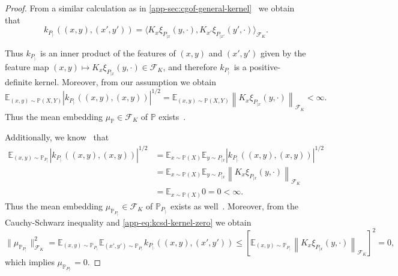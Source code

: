 \documentclass{uai2023} %
\begin{document}
\begin{proof}
From a similar calculation as in \cref{app-sec:cgof-general-kernel}~\cite[cf.][Section~A.2]{jitkrittum2020testing} we obtain that
\begin{equation*}
    k_{P_{|\cdot}}((x, y), (x', y')) = \bigg\langle K_x \xi_{P_{|x}}(y, \cdot), K_{x'} \xi_{P_{|x'}}(y', \cdot) \bigg\rangle_{\mathcal{F}_K}.
\end{equation*}

Thus $k_{P_{|\cdot}}$ is an inner product of the features of $(x, y)$ and $(x', y')$ given by the feature map $(x, y) \mapsto K_x \xi_{P_{|x}}(y, \cdot) \in \mathcal{F}_K$,
and therefore $k_{P_{|\cdot}}$ is a positive-definite kernel.
Moreover, from our assumption we obtain
\begin{equation*}
    \mathbb{E}_{(x, y) \sim \mathbb{P}(X, Y)} {|k_{P_{|\cdot}}((x, y), (x, y))|}^{1/2} = \mathbb{E}_{(x, y) \sim \mathbb{P}(X, Y)} \left\|K_{x} \xi_{P_{|x}}(y, \cdot) \right\|_{\mathcal{F}_K} < \infty.
\end{equation*}
Thus the mean embedding $\mu_{\mathbb{P}} \in \mathcal{F}_K$ of $\mathbb{P}$ exists~\citep[][Lemma~3]{gretton2012kernel}.

Additionally, we know~\citep[][Lemma~5.1]{Chwialkowski16KGOF} that
\begin{equation}\label{app-eq:kcsd-kernel-zero}
\begin{split}
\mathbb{E}_{(x, y) \sim \mathbb{P}_{P_{|\cdot}}} {|k_{P_{|\cdot}}((x, y), (x, y))|}^{1/2} &= \mathbb{E}_{x \sim \mathbb{P}(X)} \mathbb{E}_{y \sim P_{|x}} {|k_{P_{|\cdot}}((x, y), (x, y))|}^{1/2} \\
&= \mathbb{E}_{x \sim \mathbb{P}(X)} \mathbb{E}_{y \sim P_{|x}} \left\|K_{x} \xi_{P_{|x}}(y, \cdot) \right\|_{\mathcal{F}_K} \\
&= \mathbb{E}_{x \sim \mathbb{P}(X)} 0 = 0 < \infty.
\end{split}
\end{equation}
Thus the mean embedding $\mu_{\mathbb{P}_{P_{|\cdot}}} \in \mathcal{F}_K$ of $\mathbb{P}_{P_{|\cdot}}$ exists as well~\citep[][Lemma~3]{gretton2012kernel}.
Moreover, from the Cauchy-Schwarz inequality and \cref{app-eq:kcsd-kernel-zero} we obtain
\begin{equation*}
    \|\mu_{\mathbb{P}_{P_{|\cdot}}}\|^2_{\mathcal{F}_K} = \mathbb{E}_{(x, y) \sim \mathbb{P}_{P_{|\cdot}}} \mathbb{E}_{(x', y') \sim \mathbb{P}_{P_{|\cdot}}} k_{P_{|\cdot}}((x, y), (x', y')) 
    \leq {\left[\mathbb{E}_{(x, y) \sim \mathbb{P}_{P_{|\cdot}}} \left\|K_{x} \xi_{P_{|x}}(y, \cdot) \right\|_{\mathcal{F}_K} \right]}^2 = 0,
\end{equation*}
which implies $\mu_{\mathbb{P}_{P|\cdot}} = 0$.


\end{proof}
\end{document}
